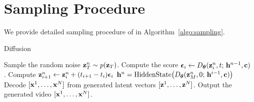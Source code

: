 \section{Sampling Procedure}
\label{appen:sampling}
We provide detailed sampling procedure of \sname in Algorithm~\ref{algo:sampling}.

\begin{algorithm}[h!]
\begin{spacing}{1.05}
\caption{\sname Diffusion}\label{algo:sampling}
\begin{algorithmic}[1]
 
\State Sample the random noise $\mathbf{z}_T^{n} \sim p(\mathbf{z}_T)$.
\State Compute the score $\bm{\epsilon}_i \leftarrow D_{\bm{\theta}}(\mathbf{z}_{i}^{n}, t;\, \mathbf{h}^{n-1}, \mathbf{c})$.
\State Compute $\mathbf{z}_{i+1}^n \leftarrow \mathbf{z}_i^n + (t_{i+1} - t_{i})\bm{\epsilon}_i$ 
\EndFor
\State $\mathbf{h}^{n} = \mathrm{HiddenState}\big(D_{\bm{\theta}} (\mathbf{z}_M^{n}, 0;\, \mathbf{h}^{i-1}, \mathbf{c})\big)$ 
\EndFor
\State Decode $[\mathbf{x}^1,\ldots,\mathbf{x}^{N}]$ from generated latent vectors $[\mathbf{z}^1,\ldots,\mathbf{z}^{N}]$.
\State Output the generated video $[\mathbf{x}^1,\ldots,\mathbf{x}^{N}]$.
\end{algorithmic}
\end{spacing}
\end{algorithm}
